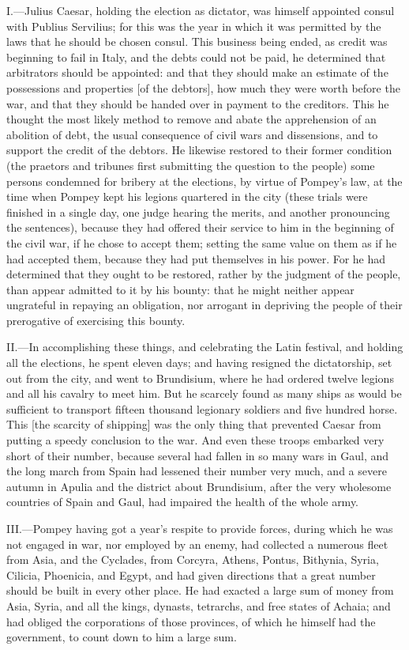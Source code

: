 I.—Julius Caesar, holding the election as dictator, was himself
appointed consul with Publius Servilius; for this was the year in which
it was permitted by the laws that he should be chosen consul. This
business being ended, as credit was beginning to fail in Italy, and the
debts could not be paid, he determined that arbitrators should be
appointed: and that they should make an estimate of the possessions and
properties [of the debtors], how much they were worth before the war,
and that they should be handed over in payment to the creditors. This he
thought the most likely method to remove and abate the apprehension of
an abolition of debt, the usual consequence of civil wars and
dissensions, and to support the credit of the debtors. He likewise
restored to their former condition (the praetors and tribunes first
submitting the question to the people) some persons condemned for
bribery at the elections, by virtue of Pompey's law, at the time when
Pompey kept his legions quartered in the city (these trials were
finished in a single day, one judge hearing the merits, and another
pronouncing the sentences), because they had offered their service to
him in the beginning of the civil war, if he chose to accept them;
setting the same value on them as if he had accepted them, because they
had put themselves in his power. For he had determined that they ought
to be restored, rather by the judgment of the people, than appear
admitted to it by his bounty: that he might neither appear ungrateful in
repaying an obligation, nor arrogant in depriving the people of their
prerogative of exercising this bounty.

II.—In accomplishing these things, and celebrating the Latin festival,
and holding all the elections, he spent eleven days; and having resigned
the dictatorship, set out from the city, and went to Brundisium, where
he had ordered twelve legions and all his cavalry to meet him. But he
scarcely found as many ships as would be sufficient to transport fifteen
thousand legionary soldiers and five hundred horse. This [the scarcity
of shipping] was the only thing that prevented Caesar from putting a
speedy conclusion to the war. And even these troops embarked very short
of their number, because several had fallen in so many wars in Gaul, and
the long march from Spain had lessened their number very much, and a
severe autumn in Apulia and the district about Brundisium, after the
very wholesome countries of Spain and Gaul, had impaired the health of
the whole army.

III.—Pompey having got a year's respite to provide forces, during which
he was not engaged in war, nor employed by an enemy, had collected a
numerous fleet from Asia, and the Cyclades, from Corcyra, Athens,
Pontus, Bithynia, Syria, Cilicia, Phoenicia, and Egypt, and had given
directions that a great number should be built in every other place. He
had exacted a large sum of money from Asia, Syria, and all the kings,
dynasts, tetrarchs, and free states of Achaia; and had obliged the
corporations of those provinces, of which he himself had the government,
to count down to him a large sum.

